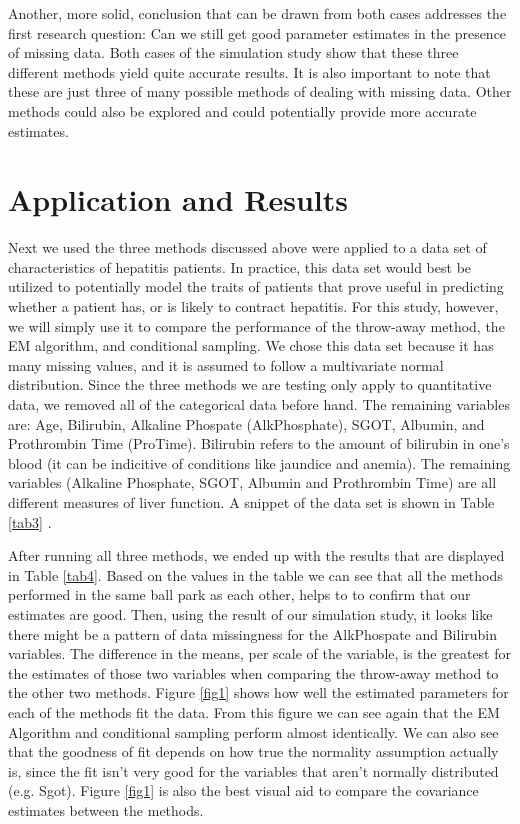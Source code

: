 \documentclass{svproc}
\begin{document}
Another, more solid, conclusion that can be drawn from both cases addresses the first research question: Can we still get good parameter estimates in the presence of missing data. Both cases of the simulation study show that these three different methods yield quite accurate results.  It is also important to note that these are just three of many possible methods of dealing with missing data. Other methods could also be explored and could potentially provide more accurate estimates. 

\section{Application and Results}

Next we used the three methods discussed above were applied to a data set of characteristics of hepatitis patients. In practice, this data set would best be utilized to potentially model the traits of patients that prove useful in predicting whether a patient has, or is likely to contract hepatitis. For this study, however, we will simply use it to compare the performance of the throw-away method, the EM algorithm, and conditional sampling. We chose this data set because it has many missing values, and it is assumed to follow a multivariate normal distribution. Since the three methods we are testing only apply to quantitative data, we removed all of the categorical data before hand. The remaining variables are: Age, Bilirubin, Alkaline Phospate (AlkPhosphate), SGOT, Albumin, and Prothrombin Time (ProTime). Bilirubin refers to the amount of bilirubin in one's blood (it can be indicitive of conditions like jaundice and anemia). The remaining variables (Alkaline Phosphate, SGOT, Albumin and Prothrombin Time) are all different measures of liver function. A snippet of the data set is shown in Table \ref{tab3} .

After running all three methods, we ended up with the results that are displayed in Table \ref{tab4}. Based on the values in the table we can see that all the methods performed in the same ball park as each other, helps to to confirm that our estimates are good. Then, using the result of our simulation study, it looks like there might be a pattern of data missingness for the AlkPhospate and Bilirubin variables. The difference in the means, per scale of the variable, is the greatest for the estimates of those two variables when comparing the throw-away method to the other two methods. Figure \ref{fig1} shows how well the estimated parameters for each of the methods fit the data. From this figure we can see again that the EM Algorithm and conditional sampling perform almost identically. We can also see that the goodness of fit depends on how true the normality assumption actually is, since the fit isn't very good for the variables that aren't normally distributed (e.g. Sgot). Figure \ref{fig1} is also the best visual aid to compare the covariance estimates between the methods. 
\end{document}
